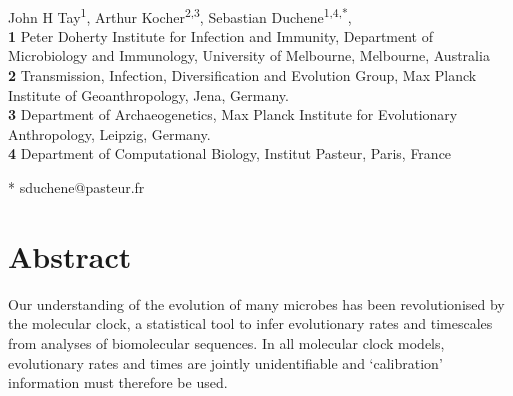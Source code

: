 \documentclass[10pt,letterpaper]{article}
\begin{document}
\vspace*{0.2in}

\begin{flushleft}
{\Large
\textbf{} %
}
\newline
\\
John H Tay\textsuperscript{1},
Arthur Kocher\textsuperscript{2,3},
Sebastian Duchene\textsuperscript{1,4,*},
\\
\bigskip
\textbf{1} Peter Doherty Institute for Infection and Immunity, Department of Microbiology and Immunology, University of Melbourne, Melbourne, Australia
\\
\textbf{2} Transmission, Infection, Diversification and Evolution Group, Max Planck Institute of Geoanthropology, Jena, Germany.
\\
\textbf{3} Department of Archaeogenetics, Max Planck Institute for Evolutionary Anthropology, Leipzig, Germany.
\\
\textbf{4} Department of Computational Biology, Institut Pasteur, Paris, France
\\
\bigskip

% 


* sduchene@pasteur.fr

\end{flushleft}
\section*{Abstract}
Our understanding of the evolution of many microbes has been revolutionised by the molecular clock, a statistical tool to infer evolutionary rates and timescales from analyses of biomolecular sequences. In all molecular clock models, evolutionary rates and times are jointly unidentifiable and `calibration' information must therefore be used. 
\end{document}
